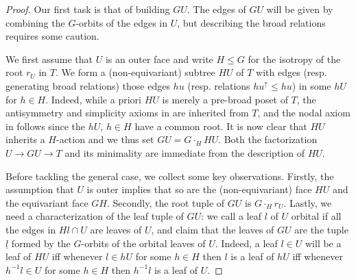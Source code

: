 \documentclass[a4paper,10pt,draft]{article}%
\begin{document}
\begin{proof}
	Our first task is that of building $GU$. The edges of $GU$ will be given by combining 
	the $G$-orbits of the edges in $U$, but describing the broad relations requires some caution.

	We first assume that $U$ is an outer face and write	$H \leq G$ for the isotropy of the root $r_U$ in $T$.
	We form a (non-equivariant) subtree $HU$ of $T$ with edges (resp. generating broad relations) those edges
	$h u$ (resp. relations $h u^{\uparrow} \leq hu$) in some $hU$ for $h \in H$.
	Indeed, while a priori $HU$ is merely a pre-broad poset of $T$, the antisymmetry and simplicity axioms in \cite[Defs. 5.1 and 5.3]{Per17} are inherited from $T$, and the nodal axiom in
	\cite[Def. 5.9]{Per17} follows since the $h U$, $h \in H$ have a common root. It is now clear that $HU$ inherits a $H$-action and we thus set $GU = G \cdot_H HU$.
	Both the factorization $U \to GU \to T$ and its minimality are immediate from the description of $HU$.
	
	Before tackling the general case, we collect some key observations. Firstly, the assumption that $U$ is outer implies that so are the (non-equivariant) face $HU$ and the equivariant face $GH$. Secondly, the root tuple of 
	$GU$ is $G\cdot_H r_U$.
	Lastly, we need a characterization of the leaf tuple of $GU$: we call a leaf $l$ of $U$ orbital if 
all the edges in $Hl \cap U$ are leaves of $U$, 
	and claim that the leaves of $GU$ are the tuple $\underline{l}$ formed by the $G$-orbits of the orbital leaves of $U$. Indeed, a leaf $l\in U$ will be a leaf of $HU$ iff whenever $l \in hU$ for some $h\in H$ then $l$ is a leaf of $hU$ iff
	whenever $h^{-1} l \in U$ for some $h\in H$ then $h^{-1}l$ is a leaf of $U$.
	

\end{proof}
\end{document}
